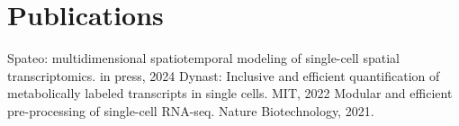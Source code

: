 \documentclass[]{resume}
\begin{document}
\begin{minipage}[t]{0.28\textwidth}
\section{Publications}
\renewcommand\refname{\vskip -1.5em} %
\begin{thebibliography}{9}
Spateo: multidimensional spatiotemporal modeling of single-cell spatial transcriptomics. in press, 2024
Dynast: Inclusive and efficient quantification of metabolically labeled transcripts in single cells. MIT, 2022
Modular and efficient pre-processing of single-cell RNA-seq. Nature Biotechnology, 2021.
\end{thebibliography}


%
%

\end{minipage}
\hfill
\end{document}
